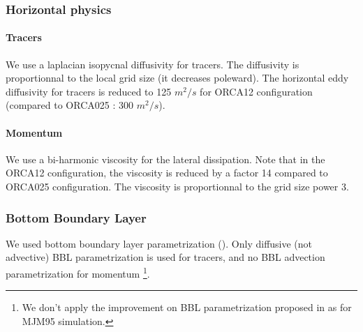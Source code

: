 \documentclass[12pt]{article}
\begin{document}
\scriptsize



\normalsize


\subsubsection{Horizontal physics}

\paragraph{Tracers \\}

We use a laplacian isopycnal diffusivity for tracers. The diffusivity is proportionnal to the local grid size (it decreases poleward). The horizontal eddy diffusivity for tracers is reduced to 125 $m^2/s$ for ORCA12 configuration (compared to ORCA025 : 300 $m^2/s$).

\scriptsize


\normalsize

\paragraph{Momentum \\}

We use a bi-harmonic viscosity for the lateral dissipation. Note that in the ORCA12 configuration, the viscosity is reduced by a factor 14 compared to ORCA025 configuration. The viscosity is proportionnal to the grid size power 3.

\scriptsize


\normalsize


\subsubsection{Bottom Boundary Layer}

We used bottom boundary layer parametrization (\cite{Beckmann1997}). Only diffusive (not advective) BBL parametrization is used for tracers, and no BBL advection parametrization for momentum \footnote{We don't apply the improvement on BBL parametrization proposed in \cite{Hervieux} as for MJM95 simulation.}.
\end{document}
